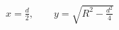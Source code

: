 \documentclass[border=2.5pt]{standalone}
\begin{document}
$\displaystyle x=\frac d2,\qquad y=\sqrt{R^2-\frac{d^2}4}$
\end{document}
